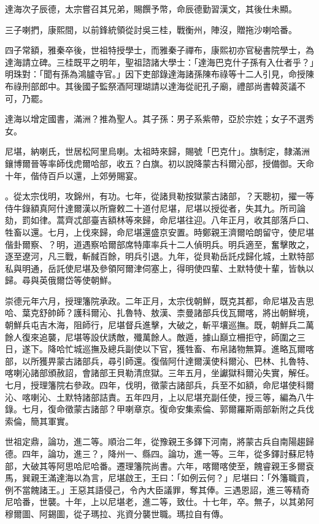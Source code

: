 \begin{pinyinscope}
達海次子辰德，太宗嘗召其兄弟，賜饌予幣，命辰德勤習漢文，其後仕未顯。

三子喇捫，康熙間，以前鋒統領從討吳三桂，戰衡州，陣沒，贈拖沙喇哈番。

四子常額，雅秦卒後，世祖特授學士，而雅秦子禪布，康熙初亦官秘書院學士，為達海請立碑。三桂既平之明年，聖祖諮諸大學士：「達海巴克什子孫有入仕者乎？」明珠對：「聞有孫為鴻臚寺官。」因下吏部錄達海諸孫陳布祿等十二人引見，命授陳布祿刑部郎中。其後國子監祭酒阿理瑚請以達海從祀孔子廟，禮部尚書韓菼議不可，乃罷。

達海以增定國書，滿洲？推為聖人。其子孫：男子系紫帶，亞於宗姓；女子不選秀女。

尼堪，納喇氏，世居松阿里烏喇。太祖時來歸，賜號「巴克什」。旗制定，隸滿洲鑲博爾晉等率師伐虎爾哈部，收五？白旗。初以說降蒙古科爾沁部，授備御。天命十年，偕侍百戶以還，上郊勞賜宴。

。從太宗伐明，攻錦州，有功。七年，從諸貝勒按獄蒙古諸部，？天聰初，擢一等侍牛錄額真阿什達爾漢以所齎敕二十道付尼堪，尼堪以授從者，失其九。所司論劾，罰如律。蒿齊忒部臺吉額林等來歸，命尼堪往迎。八年正月，收其部落戶口、牲畜以還。七月，上伐來歸，命尼堪還盛京安置。時鄭親王濟爾哈朗留守，使尼堪偕卦爾察、？明，道遇察哈爾部席特庫率兵十二人偵明兵。明兵適至，奮擊敗之，逐至遼河，凡三戰，斬馘百餘，明兵引退。九年，從貝勒岳託戍歸化城，土默特部私與明通，岳託使尼堪及參領阿爾津伺塞上，得明使四輩、土默特使十輩，皆執以歸。尋與英俄爾岱等使朝鮮。

崇德元年六月，授理籓院承政。二年正月，太宗伐朝鮮，既克其都，命尼堪及吉思哈、葉克舒帥師？護科爾沁、扎魯特、敖漢、柰曼諸部兵伐瓦爾喀，將出朝鮮境，朝鮮兵屯吉木海，阻師行，尼堪督兵進擊，大破之，斬平壤巡撫。既，朝鮮兵二萬餘人復來追襲，尼堪等設伏誘敵，殲萬餘人。敵遁，據山巔立柵拒守，師圍之三日，遂下。降哈忙城巡撫及總兵副使以下官，獲牲畜、布帛諸物無算。進略瓦爾喀部，以所獲畀蒙古諸部兵，尋引師還。復偕阿什達爾漢使科爾沁、巴林、扎魯特、喀喇沁諸部頒赦詔，會諸部王貝勒清庶獄。三年五月，坐讞獄科爾沁失實，解任。七月，授理籓院右參政。四年，伐明，徵蒙古諸部兵，兵至不如額，命尼堪使科爾沁、喀喇沁、土默特諸部詰責。五年四月，上以尼堪充副任使，授三等，編為八牛錄。七月，復命徵蒙古諸部？甲喇章京。復命安集索倫、郭爾羅斯兩部新附之兵伐索倫，簡其軍實。

世祖定鼎，論功，進二等。順治二年，從豫親王多鐸下河南，將蒙古兵自南陽趨歸德。四年，論功，進三？，降州一、縣四。論功，進一等。三年，從多鐸討蘇尼特部，大破其等阿思哈尼哈番。遷理籓院尚書。六年，喀爾喀使至，餽睿親王多爾袞馬，巽親王滿達海以為言，尼堪啟王，王曰：「如例云何？」尼堪曰：「外籓職貢，例不當餽諸王。」王惡其語侵己，令內大臣議罪，奪其俸。三遇恩詔，進三等精奇尼哈番，世襲。十年，上以尼堪老，進二等，致仕。十七年，卒。無子，以其弟阿穆爾圖、阿錫圖，從子瑪拉、兆資分襲世職。瑪拉自有傳。


\end{pinyinscope}
